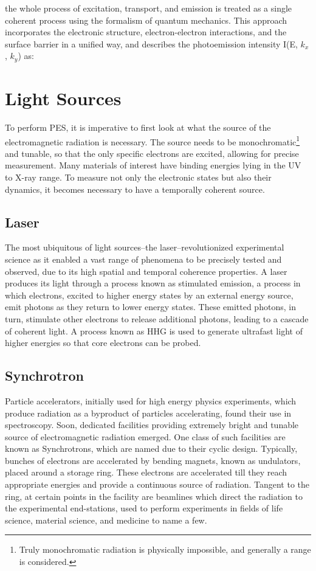 the whole process of excitation, transport, and emission is treated as a single coherent process using the formalism of quantum mechanics. This approach incorporates the electronic structure, electron-electron interactions, and the surface barrier in a unified way, and describes the photoemission intensity  I(E, $k_x$, $k_y$)  as:


\section{Light Sources}\label{section:light-sources}
To perform \gls{PES}, it is imperative to first look at what the source of the electromagnetic radiation is necessary. The source needs to be monochromatic\footnote{Truly monochromatic radiation is physically impossible, and generally a range is considered.} and tunable, so that the only specific electrons are excited, allowing for precise measurement. Many materials of interest have binding energies lying in the UV to X-ray range. To measure not only the electronic states but also their dynamics, it becomes necessary to have a temporally coherent source.


\subsection{Laser}
The most ubiquitous of light sources--the laser--revolutionized experimental science as it enabled a vast range of phenomena to be precisely tested and observed, due to its high spatial and temporal coherence properties. A laser produces its light through a process known as stimulated emission, a process in which electrons, excited to higher energy states by an external energy source, emit photons as they return to lower energy states. These emitted photons, in turn, stimulate other electrons to release additional photons, leading to a cascade of coherent light. A process known as \gls{HHG} is used to generate ultrafast light of higher energies so that core electrons can be probed.  

\subsection{Synchrotron}
Particle accelerators, initially used for high energy physics experiments, which produce radiation as a byproduct of particles accelerating, found their use in spectroscopy. Soon, dedicated facilities providing extremely bright and tunable source of electromagnetic radiation emerged. One class of such facilities are known as Synchrotrons, which are named due to their cyclic design. Typically, bunches of electrons are accelerated by bending magnets, known as \glspl{undulator}, placed around a storage ring. These electrons are accelerated till they reach appropriate energies and provide a continuous source of radiation. Tangent to the ring, at certain points in the facility are beamlines which direct the radiation to the experimental end-stations, used to perform experiments in fields of life science, material science, and medicine to name a few.

